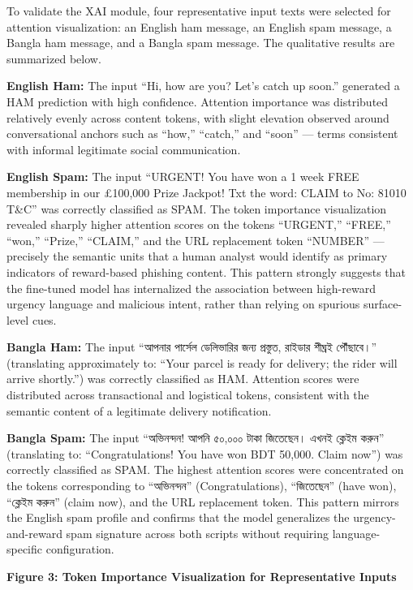 To validate the XAI module, four representative input texts were
selected for attention visualization: an English ham message, an English
spam message, a Bangla ham message, and a Bangla spam message. The
qualitative results are summarized below.

\textbf{English Ham:} The input ``Hi, how are you? Let's catch up
soon.'' generated a HAM prediction with high confidence. Attention
importance was distributed relatively evenly across content tokens, with
slight elevation observed around conversational anchors such as ``how,''
``catch,'' and ``soon'' --- terms consistent with informal legitimate
social communication.

\textbf{English Spam:} The input ``URGENT! You have won a 1 week FREE
membership in our £100,000 Prize Jackpot! Txt the word: CLAIM to No:
81010 T\&C'' was correctly classified as SPAM. The token importance
visualization revealed sharply higher attention scores on the tokens
``URGENT,'' ``FREE,'' ``won,'' ``Prize,'' ``CLAIM,'' and the URL
replacement token ``NUMBER'' --- precisely the semantic units that a
human analyst would identify as primary indicators of reward-based
phishing content. This pattern strongly suggests that the fine-tuned
model has internalized the association between high-reward urgency
language and malicious intent, rather than relying on spurious
surface-level cues.

\textbf{Bangla Ham:} The input ``আপনার পার্সেল ডেলিভারির জন্য প্রস্তুত,
রাইডার শীঘ্রই পৌঁছাবে।'' (translating approximately to: ``Your parcel is
ready for delivery; the rider will arrive shortly.'') was correctly
classified as HAM. Attention scores were distributed across
transactional and logistical tokens, consistent with the semantic
content of a legitimate delivery notification.

\textbf{Bangla Spam:} The input ``অভিনন্দন! আপনি ৫০,০০০ টাকা জিতেছেন।
এখনই ক্লেইম করুন'' (translating to: ``Congratulations! You have won BDT
50,000. Claim now'') was correctly classified as SPAM. The highest
attention scores were concentrated on the tokens corresponding to
``অভিনন্দন'' (Congratulations), ``জিতেছেন'' (have won), ``ক্লেইম করুন''
(claim now), and the URL replacement token. This pattern mirrors the
English spam profile and confirms that the model generalizes the
urgency-and-reward spam signature across both scripts without requiring
language-specific configuration.

\textbf{Figure 3: Token Importance Visualization for Representative
Inputs}

